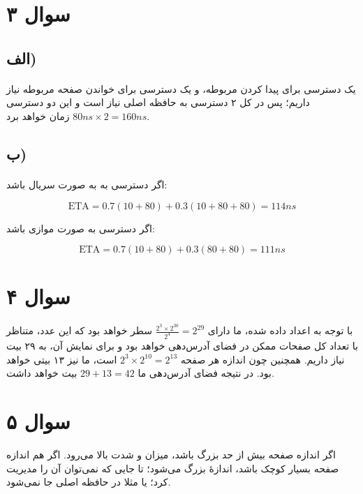 \documentclass{article}
\begin{document}
	\section*{سوال ۳}
	\subsection*{الف)}
	\paragraph*{}
	یک دسترسی برای پیدا کردن
	مربوطه، و یک دسترسی برای خواندن صفحه مربوطه نیاز داریم؛ پس در کل ۲ دسترسی به حافظه اصلی نیاز است و این دو دسترسی
	$80ns \times 2 = 160ns$
	زمان خواهد برد.

	\subsection*{ب)}
	\paragraph*{}
	اگر دسترسی به
	به صورت سریال باشد:

	\begin{equation*}
		\textrm{ETA} = 0.7(10 + 80) + 0.3(10 + 80 + 80) = 114ns
	\end{equation*}

	اگر دسترسی به صورت موازی باشد:

	\begin{equation*}
		\textrm{ETA} = 0.7(10 + 80) + 0.3(80 + 80) = 111ns
	\end{equation*}

	\section*{سوال ۴}
	\paragraph*{}
	با توجه به اعداد داده شده،
	ما دارای
	$\frac{2^3\times2^{30}}{2^4} = 2^{29}$
	سطر خواهد بود که این عدد، متناظر با تعداد کل صفحات ممکن در فضای آدرس‌دهی
	خواهد بود و برای نمایش آن، به ۲۹ بیت نیاز داریم. همچنین چون اندازه هر صفحه
	$2^3 \times 2^{10} = 2^{13}$
	است،
	ما نیز ۱۳ بیتی خواهد بود. در نتیجه فضای آدرس‌دهی
	ما
	$29 + 13 = 42$
	بیت خواهد داشت.

	\section*{سوال ۵}
	اگر اندازه صفحه بیش از حد بزرگ باشد، میزان و شدت
	بالا می‌رود. اگر هم اندازه صفحه بسیار کوچک باشد، اندازهٔ
	بزرگ می‌شود؛ تا جایی که نمی‌توان آن را مدیریت کرد؛ یا مثلا در حافظه اصلی جا نمی‌شود.
\end{document}
